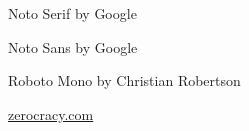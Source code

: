 \documentclass{article}
\newcommand\slide[1]{%
  \pagebreak\topskip0pt\vspace*{\fill}%
  \begin{center}\LARGE%
  #1
  \end{center}%
  \vspace*{\fill}}
\begin{document}
\slide{
  \par
  {\Huge\begin{multicols}{3}
  {\rmfamily Noto Serif by Google}
  \par\columnbreak\par
  {\sffamily Noto Sans by Google}
  \par\columnbreak\par
  {\ttfamily Roboto Mono by Christian Robertson}
  \end{multicols}\par}}

\slide{\href{https://www.zerocracy.com}{zerocracy.com}}
\end{document}
